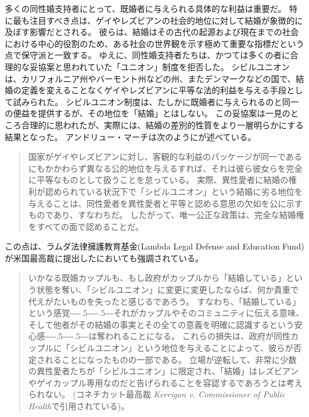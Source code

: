 \documentclass[paper=a4,book,openany]{jlreq}
\def\DDASH{―\kern-.5\zw―\kern-.5\zw―} %
\begin{document}
多くの同性婚支持者にとって、既婚者に与えられる具体的な利益は重要だ。
特に最も注目すべき点は、ゲイやレズビアンの社会的地位に対して結婚が象徴的に及ぼす影響だとされる。
彼らは、結婚はその古代の起源および現在までの社会における中心的役割のため、ある社会の世界観を示す極めて重要な指標だという点で保守派と一致する。
ゆえに、同性婚支持者たちは、かつては多くの者に合理的な妥協案と思われていた「ユニオン」制度を拒否した。
シビルユニオンは、カリフォルニア州やバーモント州などの州、またデンマークなどの国で、結婚の定義を変えることなくゲイやレズビアンに平等な法的利益を与える手段として試みられた。
シビルユニオン制度は、たしかに既婚者に与えられるのと同一の便益を提供するが、その地位を「結婚」とはしない。
この妥協案は一見のところ合理的に思われたが、実際には、結婚の差別的性質をより一層明らかにする結果となった。
アンドリュー・マーチは次のようにが述べている。

\begin{quote}
国家がゲイやレズビアンに対し、客観的な利益のパッケージが同一であるにもかかわらず異なる公的地位を与えるすれば、それは彼ら彼女らを完全に平等なものとして扱うことを怠っている。
実際、異性愛者に結婚の権利が認められている状況下で「シビルユニオン」という結婚に劣る地位を与えることは、同性愛者を異性愛者と平等と認める意思の欠如を公に示すものであり、すなわちだ。
したがって、唯一公正な政策は、完全な結婚権をすべての面で認めることだ。\citep[p.254]{march11:_is_there_right_polyg}
\end{quote}

この点は、ラムダ法律擁護教育基金(Lambda Legal Defense and Education Fund)が米国最高裁に提出したにおいても強調されている。

\begin{quote}
いかなる既婚カップルも、もし政府がカップルから「結婚している」という状態を奪い、「シビルユニオン」に変更に変更したならば、何か貴重で代えがたいものを失ったと感じるであろう。
すなわち、「結婚している」という感覚{\DDASH}それがカップルやそのコミュニティに伝える意味、そして他者がその結婚の事実とその全ての意義を明確に認識するという安心感{\DDASH}は奪われることになる。
これらの損失は、政府が同性カップルに「シビルユニオン」という地位を与えることによって、彼らが否定されることになったものの一部である。
立場が逆転して、非常に少数の異性愛者たちが「シビルユニオン」に限定され、「結婚」はレズビアンやゲイカップル専用なのだと告げられることを容認するであろうとは考えられない。
(コネチカット最高裁 \emph{Kerrigan v. Commissioner of Public Health}で引用されている)。
\end{quote}
\end{document}

